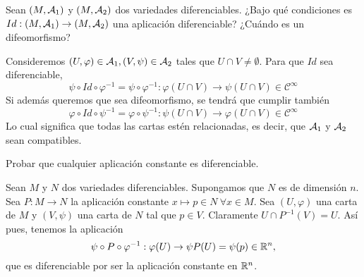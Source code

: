 \documentclass[twoside]{article}
\begin{document}
\newpage

\begin{ejercicio}{5}
Sean $(M,\mathcal{A}_1)$ y $(M,\mathcal{A}_2)$ dos variedades diferenciables. ¿Bajo qué condiciones
es $Id : (M,\mathcal{A}_1) \to (M,\mathcal{A}_2)$ una aplicación diferenciable? ¿Cuándo es un
difeomorfismo?
\end{ejercicio}
\begin{solucion}
Consideremos $(U,\varphi)\in\mathcal{A}_1, (V,\psi)\in\mathcal{A}_2$ tales que $U\cap V\neq\emptyset$. Para que $Id$ sea diferenciable, 
$$\psi\circ Id\circ\varphi^{-1}=\psi\circ\varphi^{-1}:\varphi(U\cap V)\to\psi(U\cap V)\in \mathcal{C}^\infty$$
Si además queremos que sea difeomorfismo, se tendrá que cumplir también
$$\varphi\circ Id\circ\psi^{-1}=\varphi\circ\psi^{-1}:\psi(U\cap V)\to\varphi(U\cap V)\in\mathcal{C}^\infty$$
Lo cual significa que todas las cartas estén relacionadas, es decir, que $\mathcal{A}_1$ y $\mathcal{A}_2$ sean compatibles.
\end{solucion}

\newpage

\begin{ejercicio}{6}
Probar que cualquier aplicación constante es diferenciable.
\end{ejercicio}
\begin{solucion}
Sean $M$ y $N$ dos variedades diferenciables. Supongamos que $N$ es de dimensión $n$. Sea $P:M\to N$ la aplicación constante $x\mapsto p\in N\ \forall x\in M$. Sea $(U,\varphi)$ una carta de $M$ y $(V,\psi)$ una carta de $N$ tal que $p\in V$. Claramente $U\cap P^{-1}(V)=U$. Así pues, tenemos la aplicación
$$\psi\circ P\circ\varphi^{-1}:\varphi(U)\to\psi P(U)=\psi(p)\in\mathbb{R}^n,$$
que es diferenciable por ser la aplicación constante en $\mathbb{R}^n$. 
\end{solucion}
\end{document}
